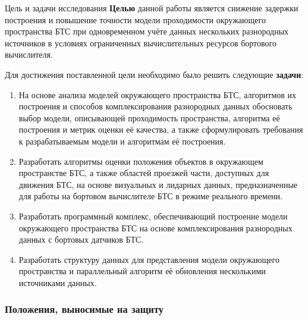\begin{frame}{Цель и задачи исследования}
	\footnotesize
	\textbf{Целью} данной работы является снижение задержки построения и повышение точности модели проходимости окружающего пространства БТС при одновременном учёте данных нескольких разнородных источников в условиях ограниченных вычислительных ресурсов бортового вычислителя.

	Для достижения поставленной цели необходимо было решить следующие \textbf{задачи}:
	\begin{enumerate}
		\item На основе анализа моделей окружающего пространства БТС, алгоритмов их построения и способов комплексирования разнородных данных обосновать выбор модели, описывающей проходимость пространства, алгоритма её построения и метрик оценки её качества, а также сформулировать требования к разрабатываемым модели и алгоритмам её построения.
		\item Разработать алгоритмы оценки положения объектов в окружающем пространстве БТС, а также областей проезжей части, доступных для движения БТС, на основе визуальных и лидарных данных, предназначенные для работы на бортовом вычислителе БТС в режиме реального времени.
		\item Разработать программный комплекс, обеспечивающий построение модели окружающего пространства БТС на основе комплексирования разнородных данных с бортовых датчиков БТС.
		\item Разработать структуру данных для представления модели окружающего пространства и параллельный алгоритм её обновления несколькими источниками данных.
	\end{enumerate}
\end{frame}

\begin{frame}[allowframebreaks]
    \frametitle{Положения, выносимые на защиту}
\end{frame}
